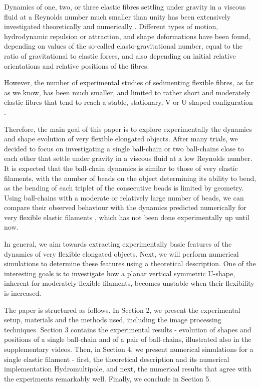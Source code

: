 \documentclass{article}
\begin{document}
Dynamics of one, two, or three elastic fibres settling under gravity in a viscous fluid at a Reynolds number much smaller than unity has been extensively investigated theoretically and numerically \cite{xu1994deformation,lagomarsino2005hydrodynamic,schlagberger2005orientation,manghi2006,li2013sedimentation,saggiorato2015conformations,shojaei2015sedimentation,marchetti2018deformation, bukowicki2018different,bukowicki2019sedimenting,koshakji2023robust}. %
Different types of motion, hydrodynamic repulsion or attraction, and shape deformations have been found, depending on values of the so-called elasto-gravitational number, equal to the ratio of gravitational to elastic forces, and also depending on initial relative orientations and relative positions of the fibres. %

However, the number of experimental studies of sedimenting flexible fibres, as far as we know,  %
has been much smaller, and limited to rather short and moderately elastic fibres that tend to reach a stable, stationary, \textquotesingle V\textquotesingle{} or \textquotesingle U\textquotesingle{} shaped configuration \cite{marchetti2018deformation}.

Therefore, the main goal of this paper is to explore experimentally the dynamics and shape evolution of very flexible elongated objects. After many trials, we decided to focus on investigating a single ball-chain or two ball-chains close to each other that settle %
under gravity in a viscous fluid at a low Reynolds number. %
It is expected that the ball-chain dynamics is similar to those of %
very elastic filaments, with the number of beads on the 
object determining its ability to bend, as 
the bending of each triplet of the consecutive beads is limited by geometry. 
Using ball-chains with a moderate or relatively large number of beads, we can compare their observed behaviour with the dynamics predicted numerically for very flexible elastic filaments \cite{saggiorato2015conformations}, which has not been done experimentally up until now. 

In general, we aim towards extracting experimentally basic features of the dynamics of very flexible elongated objects. Next, we will perform numerical simulations to determine these features using a theoretical description. One of the interesting goals is to investigate how a planar vertical symmetric U-shape, inherent for moderately flexible filaments, becomes unstable when their flexibility is increased. 

The paper is structured as follows. In Section 2, we present the experimental setup, materials and the methods used, including the image processing techniques. Section 3 contains the experimental results - evolution of shapes and positions of a single ball-chain and of a pair of ball-chains, illustrated also in the supplementary videos. Then, in Section 4, we present numerical simulations for a single elastic filament - first, the theoretical description and its numerical implementation {\sc Hydromultipole}, and next, the numerical results that agree with the experiments remarkably well. Finally, we conclude in Section 5.
\end{document}
